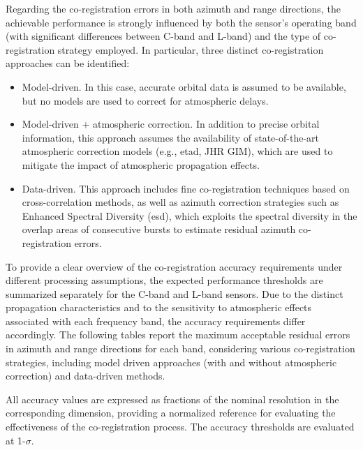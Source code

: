 Regarding the co-registration errors in both azimuth and range directions, the achievable performance is strongly influenced by both the sensor's operating band (with significant differences between C-band and L-band) and the type of co-registration strategy employed. In particular, three distinct co-registration approaches can be identified:
\begin{itemize}
    \item Model-driven. In this case, accurate orbital data is assumed to be available, but no models are used to correct for atmospheric delays.
    \item Model-driven + atmospheric correction. In addition to precise orbital information, this approach assumes the availability of state-of-the-art atmospheric correction models (e.g., \acs{etad}, JHR GIM), which are used to mitigate the impact of atmospheric propagation effects.
    \item Data-driven. This approach includes fine co-registration techniques based on cross-correlation methods, as well as azimuth correction strategies such as Enhanced Spectral Diversity (\acs{esd}), which exploits the spectral diversity in the overlap areas of consecutive bursts to estimate residual azimuth co-registration errors.
\end{itemize}
To provide a clear overview of the co-registration accuracy requirements under different processing assumptions, the expected performance thresholds are summarized separately for the C-band and L-band sensors. Due to the distinct propagation characteristics and to the sensitivity to atmospheric effects associated with each frequency band, the accuracy requirements differ accordingly. The following tables report the maximum acceptable residual errors in azimuth and range directions for each band, considering various co-registration strategies, including model driven approaches (with and without atmospheric correction) and data-driven methods. 

All accuracy values are expressed as fractions of the nominal resolution in the corresponding dimension, providing a normalized reference for evaluating the effectiveness of the co-registration process. The accuracy thresholds are evaluated at 1-$\sigma$.


